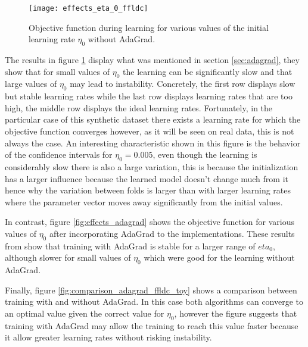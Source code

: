 \begin{figure}
  \centering
  \texttt{[image: effects\_eta\_0\_ffldc]}
  \caption{Objective function during learning for various values of the initial learning rate $\eta_0$ without AdaGrad.}
  \label{fig:effects_eta_0}
\end{figure}

The results in figure \ref{fig:effects_eta_0} display what was mentioned in section \ref{sec:adagrad}, they show that for small values of $\eta_0$ the learning can be significantly slow and that large values of $\eta_0$ may lead to instability. Concretely,  the first row displays slow but stable learning rates while the last row displays learning rates that are too high, the middle row displays the ideal learning rates. Fortunately, in the particular case of this synthetic dataset there exists a learning rate for which the objective function converges however, as it will be seen on real data, this is not always the case. An interesting characteristic shown in this figure is the behavior of the confidence intervals for $\eta_0 = 0.005$, even though the learning is considerably slow there is also a large variation, this is because the initialization has a larger influence because the learned model doesn't change much from it hence why the variation between folds is larger than with larger learning rates where the parameter vector moves away significantly from the initial values.

In contrast, figure \ref{fig:effects_adagrad} shows the objective function for various values of $\eta_{0}$ after incorporating AdaGrad to the implementations. These results from show that training with AdaGrad is stable for a larger range of $eta_0$, although slower for small values of $\eta_{0}$ which were good for the learning without AdaGrad.

Finally, figure \ref{fig:comparison_adagrad_ffldc_toy} shows a comparison between training with and without AdaGrad. In this case both algorithms can converge to an optimal value given the correct value for $\eta_{0}$, however the figure suggests that training with AdaGrad may allow the training to reach this value faster because it allow greater learning rates without risking instability.
